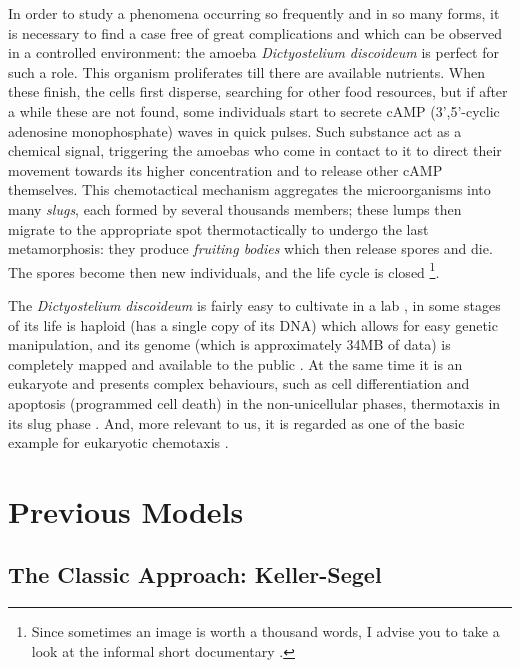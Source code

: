 In order to study a phenomena occurring so frequently and in so many forms, it is necessary to find a case free of great complications and which can be observed in a controlled environment: the amoeba \emph{Dictyostelium discoideum} is perfect for such a role.
This organism proliferates till there are available nutrients.
When these finish, the cells first disperse, searching for other food resources, but if after a while these are not found, some individuals start to secrete cAMP (3',5'-cyclic adenosine monophosphate) waves in quick pulses.
Such substance act as a chemical signal, triggering the amoebas who come in contact to it to direct their movement towards its higher concentration and to release other cAMP themselves.
This chemotactical mechanism aggregates the microorganisms into many \emph{slugs}, each formed by several thousands members; these lumps then migrate to the appropriate spot thermotactically to undergo the last metamorphosis: they produce \emph{fruiting bodies} which then release spores and die.
The spores become then new individuals, and the life cycle is closed
\footnote[1]{Since sometimes an image is worth a thousand words, I advise you to take a look at the informal short documentary \cite{ze-frank}.}.


The \emph{Dictyostelium discoideum} is fairly easy to cultivate in a lab \cite[Chapter 4]{dd-in-lab}, in some stages of its life is haploid (\ie has a single copy of its DNA) which allows for easy genetic manipulation, and its genome (which is approximately 34MB of data) is completely mapped and available to the public \cite{dd-bioinfo-lj}.
At the same time it is an eukaryote and presents complex behaviours, such as cell differentiation and apoptosis (programmed cell death) in the non-unicellular phases, thermotaxis in its slug phase \cite{thermotaxis-dd}.
And, more relevant to us, it is regarded as one of the basic example for eukaryotic chemotaxis \cite{chemotaxis-cancer-and-simpler-models}.

\section{Previous Models}

\subsection{The Classic Approach: Keller-Segel}

